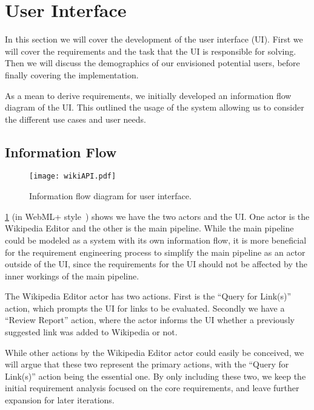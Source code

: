 \section{User Interface}\label{sec:design_ui}

In this section we will cover the development of the user interface (UI). First we will cover the requirements and the task that the UI is responsible for solving. Then we will discuss the demographics of our envisioned potential users, before finally covering the implementation. 

As a mean to derive requirements, we initially developed an information flow diagram of the UI\@. This outlined the usage of the system allowing us to consider the different use cases and user needs.

\subsection{Information Flow}

\begin{figure}[tbp]
\centering
\texttt{[image: wikiAPI.pdf]}
\caption{Information flow diagram for user interface.}\label{fig:information_flow_UI}
\end{figure}	

\cref{fig:information_flow_UI} (in WebML+ style~\cite{Casteleyn2009}) shows we have the two actors and the UI\@. One actor is the Wikipedia Editor and the other is the main pipeline. While the main pipeline could be modeled as a system with its own information flow, it is more beneficial for the requirement engineering process to simplify the main pipeline as an actor outside of the UI, since the requirements for the UI should not be affected by the inner workings of the main pipeline.

The Wikipedia Editor actor has two actions. First is the \enquote{Query for Link(s)} action, which prompts the UI for links to be evaluated. Secondly we have a \enquote{Review Report} action, where the actor informs the UI whether a previously suggested link was added to Wikipedia or not.

While other actions by the Wikipedia Editor actor could easily be conceived, we will argue that these two represent the primary actions, with the \enquote{Query for Link(s)} action being the essential one. By only including these two, we keep the initial requirement analysis focused on the core requirements, and leave further expansion for later iterations.


